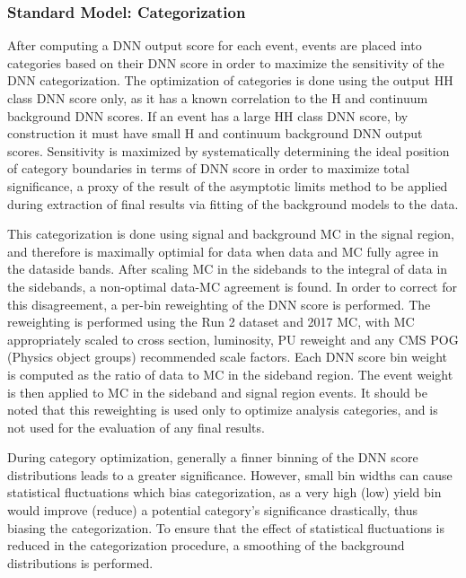\subsubsection{Standard Model: Categorization} \label{subsubsec:SLCategorization}

After computing a DNN output score for each event, events are placed into categories based on their DNN score in order to maximize the sensitivity of the DNN categorization. The optimization of categories 
is done using the output HH class DNN score only, as it has a known correlation to the H and continuum background DNN scores. If an event has a large HH class DNN score, by construction 
it must have small H and continuum background DNN output scores. 
Sensitivity is maximized by systematically determining the ideal position of category boundaries in terms of DNN score in order to maximize total significance, a 
proxy of the result of the asymptotic limits method to be applied during extraction of final results via fitting of the background models to the data.

This categorization is done using signal and background MC in the signal region,
and therefore is maximally optimial for data when data and MC fully agree in the dataside bands. After scaling MC in the sidebands to the integral of data in the sidebands, a non-optimal data-MC agreement is found. In order to correct for this disagreement, 
a per-bin reweighting of the DNN score is performed. The reweighting is performed using the Run 2 dataset and 2017 MC, with MC appropriately scaled to cross section, luminosity, 
PU reweight and any CMS POG (Physics object groups) recommended scale factors. Each DNN score bin weight is computed as the ratio of data to MC in the sideband region. The event weight is then applied to MC 
in the sideband and signal region events. It should be noted that this reweighting is used only to optimize analysis categories, and is not used for the evaluation of 
any final results. %

During category optimization, generally a finner binning of the DNN score distributions leads to a greater significance. However, small bin widths can cause statistical fluctuations which 
bias categorization, as a very high (low) yield bin would improve (reduce) a potential category's significance drastically, thus biasing the categorization. To ensure that the 
effect of statistical fluctuations is reduced in the categorization procedure, a smoothing of the background distributions is performed. %

